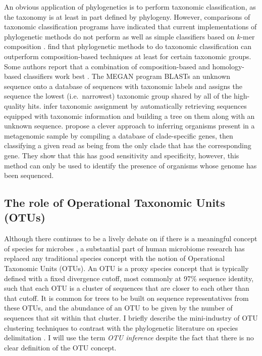 \documentclass{amsart}
\begin{document}
An obvious application of phylogenetics is to perform taxonomic classification, as the taxonomy is at least in part defined by phylogeny.
However, comparisons of taxonomic classification programs \citep{liu2008accurate,bazinet2012comparative} have indicated that current implementations of phylogenetic methods do not perform as well as simple classifiers based on $k$-mer composition \citep{wang2007naive,rosen2008metagenome}.
\citet{srinivasan2012bacterial} find that phylogenetic methods to do taxonomic classification can outperform composition-based techniques at least for certain taxonomic groups.
Some authors report that a combination of composition-based and homology-based classifiers work best \citep{brady2009phymm,parks2011classifying}.
The MEGAN program \citep{huson2007megan,huson2011integrative} BLASTs an unknown sequence onto a database of sequences with taxonomic labels and assigns the sequence the lowest (i.e.\ narrowest) taxonomic group shared by all of the high-quality hits.
\citet{munch2008statistical,munch2008fast} infer taxonomic assignment by automatically retrieving sequences equipped with taxonomic information and building a tree on them along with an unknown sequence.
\citet{segata2012metagenomic} propose a clever approach to inferring organisms present in a metagenomic sample by compiling a database of clade-specific genes, then classifying a given read as being from the only clade that has the corresponding gene.
They show that this has good sensitivity and specificity, however, this method can only be used to identify the presence of organisms whose genome has been sequenced.

\subsection{The role of Operational Taxonomic Units (OTUs)}
Although there continues to be a lively debate on if there is a meaningful concept of species for microbes \citep{bapteste2009prokaryotic,caro2012bacterial}, a substantial part of human microbiome research has replaced any traditional species concept with the notion of Operational Taxonomic Units (OTUs).
An OTU is a proxy species concept that is typically defined with a fixed divergence cutoff, most commonly at 97\% sequence identity, such that each OTU is a cluster of sequences that are closer to each other than that cutoff.
It is common for trees to be built on sequence representatives from these OTUs, and the abundance of an OTU to be given by the number of sequences that sit within that cluster.
I briefly describe the mini-industry of OTU clustering techniques to contrast with the phylogenetic literature on species delimitation \citep{pons2006sequence,yang2010bayesian}.
I will use the term \emph{OTU inference} despite the fact that there is no clear definition of the OTU concept.
\end{document}
